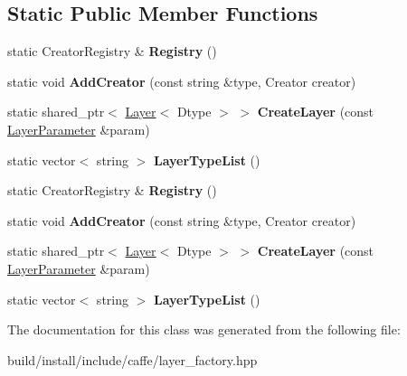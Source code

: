 \subsection*{Static Public Member Functions}
\begin{DoxyCompactItemize}
\item 
\mbox{\label{classcaffe_1_1_layer_registry_a4b9821dbacaf0d158981fa293d5acf15}} 
static Creator\+Registry \& {\bfseries Registry} ()
\item 
\mbox{\label{classcaffe_1_1_layer_registry_aba9246a3bd332dd9a3c5620b0ddf1e3f}} 
static void {\bfseries Add\+Creator} (const string \&type, Creator creator)
\item 
\mbox{\label{classcaffe_1_1_layer_registry_a17510acda367b34ddd8a65a1e14e3986}} 
static shared\+\_\+ptr$<$ \mbox{\hyperlink{classcaffe_1_1_layer}{Layer}}$<$ Dtype $>$ $>$ {\bfseries Create\+Layer} (const \mbox{\hyperlink{classcaffe_1_1_layer_parameter}{Layer\+Parameter}} \&param)
\item 
\mbox{\label{classcaffe_1_1_layer_registry_a76db56c94b384495ef568a8933c935d9}} 
static vector$<$ string $>$ {\bfseries Layer\+Type\+List} ()
\item 
\mbox{\label{classcaffe_1_1_layer_registry_a4b9821dbacaf0d158981fa293d5acf15}} 
static Creator\+Registry \& {\bfseries Registry} ()
\item 
\mbox{\label{classcaffe_1_1_layer_registry_aba9246a3bd332dd9a3c5620b0ddf1e3f}} 
static void {\bfseries Add\+Creator} (const string \&type, Creator creator)
\item 
\mbox{\label{classcaffe_1_1_layer_registry_a17510acda367b34ddd8a65a1e14e3986}} 
static shared\+\_\+ptr$<$ \mbox{\hyperlink{classcaffe_1_1_layer}{Layer}}$<$ Dtype $>$ $>$ {\bfseries Create\+Layer} (const \mbox{\hyperlink{classcaffe_1_1_layer_parameter}{Layer\+Parameter}} \&param)
\item 
\mbox{\label{classcaffe_1_1_layer_registry_a76db56c94b384495ef568a8933c935d9}} 
static vector$<$ string $>$ {\bfseries Layer\+Type\+List} ()
\end{DoxyCompactItemize}


The documentation for this class was generated from the following file\+:\begin{DoxyCompactItemize}
\item 
build/install/include/caffe/layer\+\_\+factory.\+hpp\end{DoxyCompactItemize}

